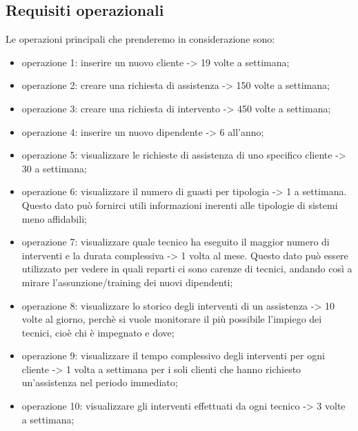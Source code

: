 \documentclass[legalpaper]{article}
\begin{document}
	\subsection{Requisiti operazionali}
	Le operazioni principali che prenderemo in considerazione sono:
	\begin{itemize}
		\item operazione 1: inserire un nuovo cliente -> 19 volte a settimana;
		\item operazione 2: creare una richiesta di assistenza -> 150 volte a settimana;
		\item operazione 3: creare una richiesta di intervento -> 450 volte a settimana;
		\item operazione 4: inserire un nuovo dipendente -> 6 all'anno;
		\item operazione 5: visualizzare le richieste di assistenza di uno specifico cliente -> 30 a settimana;
		\item operazione 6: visualizzare il numero di guasti per tipologia -> 1 a settimana. Questo dato può fornirci utili informazioni inerenti alle tipologie di sistemi meno affidabili; 
		\item operazione 7: visualizzare quale tecnico ha eseguito il maggior numero di interventi e la durata complessiva -> 1 volta al mese. Questo dato può essere utilizzato per vedere in quali reparti ci sono carenze di tecnici, andando così a mirare l'assunzione/training dei nuovi dipendenti;
		\item operazione 8: visualizzare lo storico degli interventi di un assistenza -> 10 volte al giorno, perchè si vuole monitorare il più possibile l'impiego dei tecnici, cioè chi è impegnato e dove;
		\item operazione 9: visualizzare il tempo complessivo degli interventi per ogni cliente -> 1 volta a settimana per i soli clienti che hanno richiesto un'assistenza nel periodo immediato;
		\item operazione 10: visualizzare gli interventi effettuati da ogni tecnico -> 3 volte a settimana;
	\end{itemize}
\end{document}
